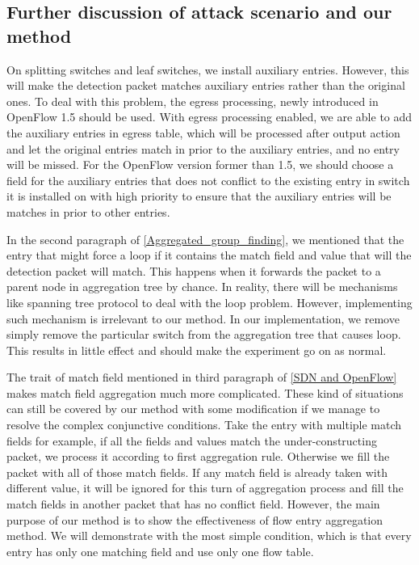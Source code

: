 \subsection{Further discussion of attack scenario and our method}
\label{Further_discussion}
On splitting switches and leaf switches, we install auxiliary entries. However, this will make the detection packet matches auxiliary entries rather than the original ones. To deal with this problem, the egress processing, newly introduced in OpenFlow 1.5 \cite{OF_SPEC_15} should be used. With egress processing enabled, we are able to add the auxiliary entries in egress table, which will be processed after output action and let the original entries match in prior to the auxiliary entries, and no entry will be missed. For the OpenFlow version former than 1.5, we should choose a field for the auxiliary entries that does not conflict to the existing entry in switch it is installed on with high priority to ensure that the auxiliary entries will be matches in prior to other entries.

In the second paragraph of \ref{Aggregated_group_finding}, we mentioned that the entry that might force a loop if it contains the match field and value that will the detection packet will match. This happens when it forwards the packet to a parent node in aggregation tree by chance. In reality, there will be mechanisms like spanning tree protocol to deal with the loop problem. However, implementing such mechanism is irrelevant to our method. In our implementation, we remove simply remove the particular switch from the aggregation tree that causes loop. This results in little effect and should make the experiment go on as normal.

The trait of match field mentioned in third paragraph of \ref{SDN and OpenFlow} makes match field aggregation much more complicated. These kind of situations can still be covered by our method with some modification if we manage to resolve the complex conjunctive conditions. Take the entry with multiple match fields for example, if all the fields and values match the under-constructing packet, we process it according to first aggregation rule. Otherwise we fill the packet with all of those match fields. If any match field is already taken with different value, it will be ignored for this turn of aggregation process and fill the match fields in another packet that has no conflict field. However, the main purpose of our method is to show the effectiveness of flow entry aggregation method. We will demonstrate with the most simple condition, which is that every entry has only one matching field and use only one flow table.

